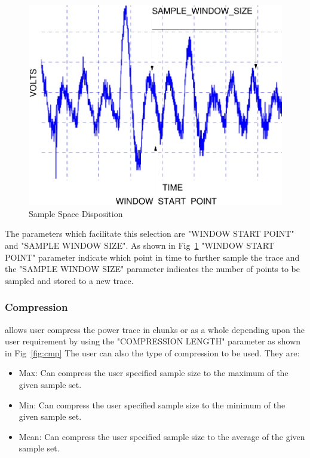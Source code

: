 \documentclass{llncs}
\numberwithin{algorithm}{chapter}
\begin{document}
\begin{figure}[ht]
\begin{center}
\includegraphics[scale=0.6]{figures/SampleSpaceDisp}
\caption{\label{fig:ssd}Sample Space Disposition}
\end{center} 
\vspace{-3ex}
\end{figure}

The parameters which facilitate this selection are "WINDOW START POINT" and "SAMPLE WINDOW SIZE". As shown in
Fig~\ref{fig:ssd} "WINDOW START POINT" parameter indicate which point in time to further sample the trace and the
"SAMPLE WINDOW SIZE" parameter indicates the number of points to be sampled and stored to a new trace.

\subsubsection{Compression} allows user compress the power trace in chunks or as a whole
depending upon the user requirement by using the "COMPRESSION LENGTH" parameter as shown in Fig~\ref{fig:cmp}
The user can also the type of compression to be used. They are:
\begin{itemize}
\item Max: Can compress the user specified sample size to the maximum of the given sample set.
\item Min: Can compress the user specified sample size to the minimum of the given sample set.
\item Mean: Can compress the user specified sample size to the average of the given sample set.
\end{itemize}
\end{document}
